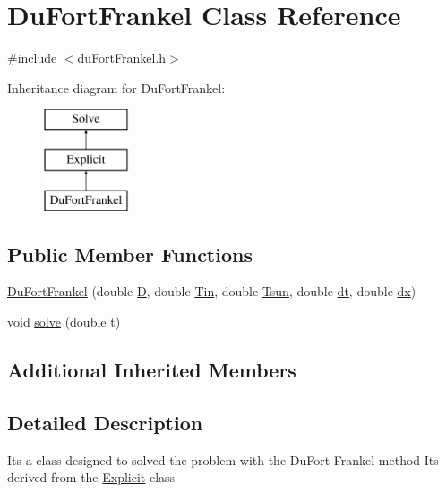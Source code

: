 \hypertarget{class_du_fort_frankel}{}\section{Du\+Fort\+Frankel Class Reference}
\label{class_du_fort_frankel}


{\ttfamily \#include $<$du\+Fort\+Frankel.\+h$>$}

Inheritance diagram for Du\+Fort\+Frankel\+:\begin{figure}[H]
\begin{center}
\leavevmode
\includegraphics[height=3.000000cm]{class_du_fort_frankel}
\end{center}
\end{figure}
\subsection*{Public Member Functions}
\begin{DoxyCompactItemize}
\item 
\hyperlink{class_du_fort_frankel_ab9a6490d0fd3b08e7e22fba2ade16c19}{Du\+Fort\+Frankel} (double \hyperlink{class_solve_ab6b73352e9bca73bad1b133fc84f008c}{D}, double \hyperlink{class_solve_a324c747af91a26a206d7772853b8655e}{Tin}, double \hyperlink{class_solve_a7145536b49fb1ac4d2f36f800d118616}{Tsun}, double \hyperlink{class_solve_ac1befb9c006f895fb0517e19c412ca57}{dt}, double \hyperlink{class_solve_a21b9b8118f508e079f066d2ce2816dd1}{dx})
\item 
void \hyperlink{class_du_fort_frankel_a73204223c7ace1e3f95e5d89d02c5208}{solve} (double t)
\end{DoxyCompactItemize}
\subsection*{Additional Inherited Members}


\subsection{Detailed Description}
It\textquotesingle{}s a class designed to solved the problem with the Du\+Fort-\/\+Frankel method It\textquotesingle{}s derived from the \hyperlink{class_explicit}{Explicit} class


